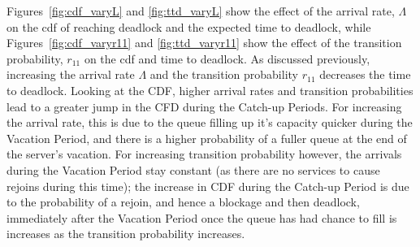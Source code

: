 \documentclass{article}
\begin{document}
Figures~\ref{fig:cdf_varyL} and \ref{fig:ttd_varyL} show the effect of the arrival rate, $\Lambda$ on the cdf of reaching deadlock and the expected time to deadlock, while Figures~\ref{fig:cdf_varyr11} and \ref{fig:ttd_varyr11} show the effect of the transition probability, $r_{11}$ on the cdf and time to deadlock. As discussed previously, increasing the arrival rate $\Lambda$ and the transition probability $r_{11}$ decreases the time to deadlock. Looking at the CDF, higher arrival rates and transition probabilities lead to a greater jump in the CFD during the Catch-up Periods. For increasing the arrival rate, this is due to the queue filling up it's capacity quicker during the Vacation Period, and there is a higher probability of a fuller queue at the end of the server's vacation. For increasing transition probability however, the arrivals during the Vacation Period stay constant (as there are no services to cause rejoins during this time); the increase in CDF during the Catch-up Period is due to the probability of a rejoin, and hence a blockage and then deadlock, immediately after the Vacation Period once the queue has had chance to fill is increases as the transition probability increases.
\end{document}
